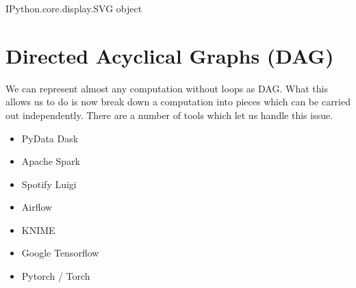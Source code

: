 \documentclass[letterpaper,10pt,english]{sphinxmanual}
\begin{document}
\begin{sphinxVerbatim}[commandchars=\\\{\}]
                

\end{sphinxVerbatim}

\begin{sphinxVerbatim}[commandchars=\\\{\}]
\PYGZlt{}IPython.core.display.SVG object\PYGZgt{}
\end{sphinxVerbatim}


\chapter{Directed Acyclical Graphs (DAG)}
\label{\detokenize{01-Introduction:directed-acyclical-graphs-dag}}
\sphinxAtStartPar
We can represent almost any computation without loops as DAG. What this allows us to do is now break down a computation into pieces which can be carried out independently. There are a number of tools which let us handle this issue.
\begin{itemize}
\item {} 
\sphinxAtStartPar
PyData Dask \sphinxhyphen{} 

\item {} 
\sphinxAtStartPar
Apache Spark \sphinxhyphen{} 

\item {} 
\sphinxAtStartPar
Spotify Luigi \sphinxhyphen{} 

\item {} 
\sphinxAtStartPar
Airflow \sphinxhyphen{} 

\item {} 
\sphinxAtStartPar
KNIME \sphinxhyphen{} 

\item {} 
\sphinxAtStartPar
Google Tensorflow \sphinxhyphen{} 

\item {} 
\sphinxAtStartPar
Pytorch / Torch \sphinxhyphen{} 

\end{itemize}
\end{document}
